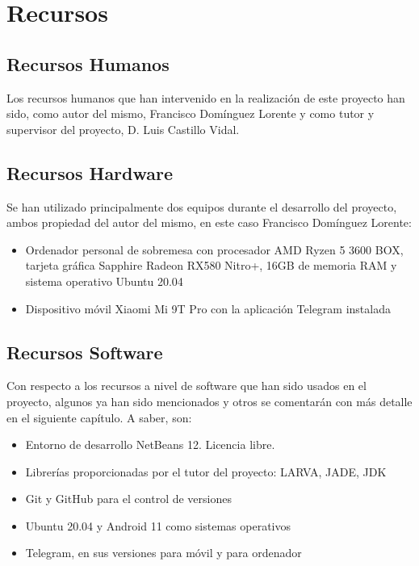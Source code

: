 \section{Recursos}

\subsection{Recursos Humanos}

Los recursos humanos que han intervenido en la realización de este proyecto han sido, como autor del mismo, Francisco Domínguez Lorente y como tutor y supervisor del proyecto, D. Luis Castillo Vidal.

\subsection{Recursos Hardware}

Se han utilizado principalmente dos equipos durante el desarrollo del proyecto, ambos propiedad del autor del mismo, en este caso Francisco Domínguez Lorente:\\

\begin{itemize}
	\item Ordenador personal de sobremesa con procesador AMD Ryzen 5 3600 BOX, tarjeta gráfica Sapphire Radeon RX580 Nitro+, 16GB de memoria RAM y sistema operativo Ubuntu 20.04
	\item Dispositivo móvil Xiaomi Mi 9T Pro con la aplicación Telegram instalada
\end{itemize}

\subsection{Recursos Software}

Con respecto a los recursos a nivel de software que han sido usados en el proyecto, algunos ya han sido mencionados y otros se comentarán con más detalle en el siguiente capítulo. A saber, son:\\

\begin{itemize}
	\item Entorno de desarrollo NetBeans 12. Licencia libre.
	\item Librerías proporcionadas por el tutor del proyecto: LARVA, JADE, JDK
	\item Git y GitHub para el control de versiones
	\item Ubuntu 20.04 y Android 11 como sistemas operativos
	\item Telegram, en sus versiones para móvil y para ordenador
\end{itemize}

